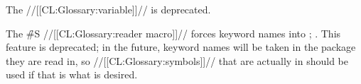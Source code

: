  The //[[CL:Glossary:variable]]//  is deprecated.

\endsubsection%


 The \f{\#S} //[[CL:Glossary:reader macro]]// forces keyword names into ; \seesection\SharpsignS. This feature is deprecated; in the future, keyword names will be taken in the package they are read in, so //[[CL:Glossary:symbols]]// that are actually in  should be used if that is what is desired.

\endsubsection%

